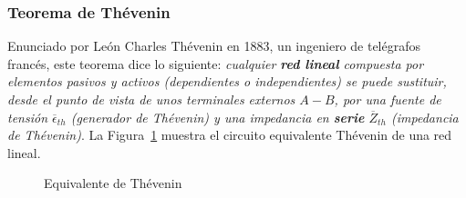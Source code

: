 \subsubsection{Teorema de Thévenin}
Enunciado por León Charles Thévenin en 1883, un ingeniero de
telégrafos francés, este teorema dice lo siguiente: \textit{cualquier
  \textbf{red lineal} compuesta por elementos pasivos y activos
  (dependientes o independientes) se puede sustituir, desde el punto
  de vista de unos terminales externos $A-B$, por una fuente de
  tensión $\overline{\epsilon}_{th}$ (generador de Thévenin) y una
  impedancia en \textbf{serie} $\overline{Z}_{th}$ (impedancia de
  Thévenin)}. La Figura~\ref{fig:thevenin_ca} muestra el circuito
equivalente Thévenin de una red lineal.
\begin{figure}[H]
  \centering {}\hfil
  \caption{Equivalente de Thévenin}
  \label{fig:thevenin_ca}
\end{figure}
     
